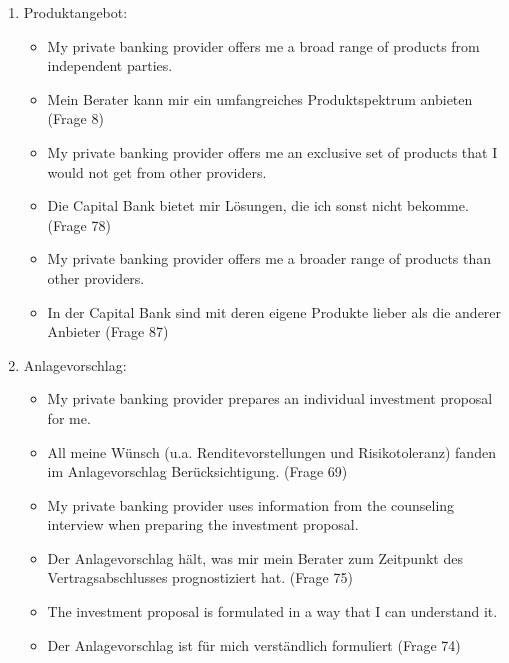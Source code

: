 \documentclass{article}\usepackage[]{graphicx}\usepackage[]{color}
\begin{document}
\begin{enumerate}
    \item Produktangebot:    
    \begin{itemize}
        \item My private banking provider offers me a broad range of products from independent parties.
        \item Mein Berater kann mir ein umfangreiches Produktspektrum anbieten (Frage 8)
        \item My private banking provider offers me an exclusive set of products that I would not get from other providers.
        \item Die Capital Bank bietet mir Lösungen, die ich sonst nicht bekomme. (Frage 78)
        \item My private banking provider offers me a broader range of products than other providers.
        \item In der Capital Bank sind mit deren eigene Produkte lieber als die  anderer Anbieter (Frage 87)
    \end{itemize}
    
    
   
   
    
   
    
    \item Anlagevorschlag:    
    \begin{itemize}
        \item My private banking provider prepares an individual investment proposal for me.
        \item  All meine Wünsch (u.a. Renditevorstellungen und Risikotoleranz) fanden im Anlagevorschlag Berücksichtigung. (Frage 69)
        \item  My private banking provider uses information from the counseling interview when preparing the investment proposal.
        \item Der Anlagevorschlag hält, was mir mein Berater zum Zeitpunkt des Vertragsabschlusses prognostiziert hat. (Frage 75)
        \item The investment proposal is formulated in a way that I can understand it.
        \item Der Anlagevorschlag ist für mich verständlich formuliert (Frage 74)
    \end{itemize}
    

\end{enumerate}
\end{document}
